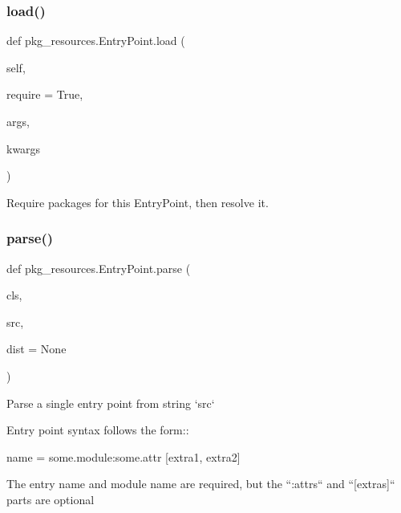\subsubsection{\texorpdfstring{load()}{load()}}
{\footnotesize\ttfamily def pkg\+\_\+resources.\+Entry\+Point.\+load (\begin{DoxyParamCaption}\item[{}]{self,  }\item[{}]{require = {\ttfamily True},  }\item[{}]{args,  }\item[{}]{kwargs }\end{DoxyParamCaption})}

\begin{DoxyVerb}Require packages for this EntryPoint, then resolve it.
\end{DoxyVerb}
 \mbox{\label{classpkg__resources_1_1_entry_point_a3b155a03ae9e3e5f722c8258ddcec0cd}} 
\subsubsection{\texorpdfstring{parse()}{parse()}}
{\footnotesize\ttfamily def pkg\+\_\+resources.\+Entry\+Point.\+parse (\begin{DoxyParamCaption}\item[{}]{cls,  }\item[{}]{src,  }\item[{}]{dist = {\ttfamily None} }\end{DoxyParamCaption})}

\begin{DoxyVerb}Parse a single entry point from string `src`

Entry point syntax follows the form::

    name = some.module:some.attr [extra1, extra2]

The entry name and module name are required, but the ``:attrs`` and
``[extras]`` parts are optional
\end{DoxyVerb}
 \mbox{\label{classpkg__resources_1_1_entry_point_aa6103add7859c9b6e0338b6866fe44ba}} 
